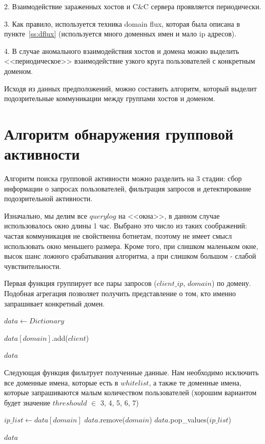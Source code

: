 \documentclass[a4paper,14pt]{extreport} %
\begin{document}
2. Взаимодействие зараженных хостов и C\&C сервера проявляется периодически.
	
3. Как правило, используется техника domain flux, которая была описана в пункте~\ref{ss:dflux} (используется много доменных имен и мало ip адресов).

4. В случае аномального взаимодействия хостов и домена можно выделить <<периодическое>> взаимодействие узкого круга пользователей с конкретным доменом.
	
Исходя из данных предположений, можно составить алгоритм, который выделит подозрительные коммуникации между группами хостов и доменом.
	
\section{Алгоритм обнаружения групповой активности}
	
Алгоритм поиска групповой активности можно разделить на 3 стадии: сбор информации о запросах пользователей, фильтрация запросов и детектирование подозрительной активности. 
	
Изначально, мы делим все $querylog$ на <<окна>>, в данном случае использовалось окно длины 1 час. Выбрано это число из таких соображений: частая коммуникация не свойственна ботнетам, поэтому не имеет смысл использовать окно меньшего размера. Кроме того, при слишком маленьком окне, высок шанс ложного срабатывания алгоритма, а при слишком большом - слабой чувствительности.
	
Первая функция группирует все пары запросов ($client\_ip$, $domain$) по домену. Подобная агрегация позволяет получить представление о том, кто именно запрашивает конкретный домен.
\begin{algorithmic}
	\State $data\gets Dictionary$
			
	\State $data[domain]$.add($client$)
	\EndFor
			
	\State \Return $data$
	\EndFunction
\end{algorithmic}

Следующая функция фильтрует полученные данные. Нам необходимо исключить все доменные имена, которые есть в $whitelist$, а также те доменные имена, которые запрашиваются малым количеством пользователей (хорошим вариантом будет значение $threshould$ $\in$ 3, 4, 5, 6, 7)
	

\begin{algorithmic}
	\State $ip\_list\gets data[domain]$
	\State $data$.remove($domain$)
	\State $data$.pop\_values($ip\_list$)
	\EndIf
				
				
	\EndFor
	\State \Return $data$
	\EndFunction
\end{algorithmic}
	
\end{document}
